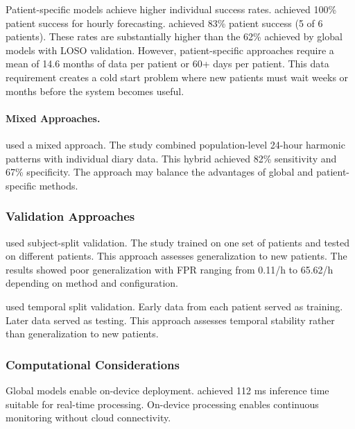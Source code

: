 Patient-specific models achieve higher individual success rates. \textcite{stirlingForecastingSeizureLikelihood2021} achieved 100\% patient success for hourly forecasting. \textcite{nasseriAmbulatorySeizureForecasting2021} achieved 83\% patient success (5 of 6 patients). These rates are substantially higher than the 62\% achieved by global models with LOSO validation. However, patient-specific approaches require a mean of 14.6 months of data per patient or 60+ days per patient. This data requirement creates a cold start problem where new patients must wait weeks or months before the system becomes useful.

\paragraph{Mixed Approaches.}
\textcite{vielufSeizureMonitoringCombined2025} used a mixed approach. The study combined population-level 24-hour harmonic patterns with individual diary data. This hybrid achieved 82\% sensitivity and 67\% specificity. The approach may balance the advantages of global and patient-specific methods.

\subsubsection{Validation Approaches}

\textcite{reintjesECGBasedDetectionEpileptic2025} used subject-split validation. The study trained on one set of patients and tested on different patients. This approach assesses generalization to new patients. The results showed poor generalization with FPR ranging from 0.11/h to 65.62/h depending on method and configuration.

\textcite{nasseriAmbulatorySeizureForecasting2021} used temporal split validation. Early data from each patient served as training. Later data served as testing. This approach assesses temporal stability rather than generalization to new patients.

\subsubsection{Computational Considerations}

Global models enable on-device deployment. \textcite{spahrDeepLearningbasedDetection2025} achieved 112 ms inference time suitable for real-time processing. On-device processing enables continuous monitoring without cloud connectivity.

